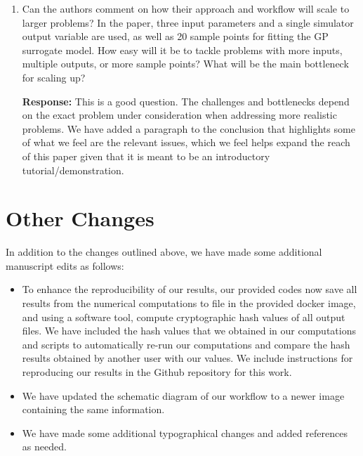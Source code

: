 \documentclass{article}
\begin{document}
\begin{enumerate}
\item Can the authors comment on how their approach and workflow will scale to larger problems? In the paper, three input parameters and a single simulator output variable are used, as well as 20 sample points for fitting the GP surrogate model. How easy will it be to tackle problems with more inputs, multiple outputs, or more sample points? What will be the main bottleneck for scaling up?

  \textbf{Response:} This is a good question. The challenges and
  bottlenecks depend on the exact problem under consideration when addressing
  more realistic problems. We have added a paragraph to the conclusion
  that highlights some of what we feel are the relevant issues, which
  we feel helps expand the reach of this paper given that it is meant
  to be an introductory tutorial/demonstration.
  
\end{enumerate}

\section{Other Changes}

In addition to the changes outlined above, we have made some additional
manuscript edits as follows:

\begin{itemize}

  \item To enhance the reproducibility of our results,
    our provided codes now save all results from the numerical computations
    to file in the provided docker image, and using a software tool,
    compute cryptographic hash values of all output files. We have included
    the hash values that we obtained in our computations and scripts to
    automatically re-run our computations and compare the hash results
    obtained by another user with our values. We include instructions
    for reproducing our results in the Github repository for this work.

  \item We have updated the schematic diagram of our workflow to a newer
    image containing the same information.

  \item We have made some additional typographical changes and added
    references as needed.

\end{itemize}
\end{document}
